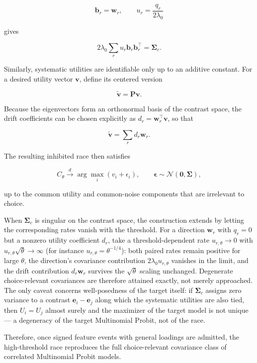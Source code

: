 \documentclass[
  man,
  floatsintext,
  longtable,
  a4paper,
  nolmodern,
  notxfonts,
  notimes,
  colorlinks=true,linkcolor=blue,citecolor=blue,urlcolor=blue]{apa7}
\begin{document}
\[
\mathbf b_r=\mathbf w_r,
\qquad
u_r=\frac{q_r}{2\lambda_0}
\]

gives

\[
2\lambda_0
\sum_r
u_r\mathbf b_r\mathbf b_r^\top
=
\boldsymbol\Sigma_c.
\]

Similarly, systematic utilities are identifiable only up to an additive
constant. For a desired utility vector \(\mathbf v\), define its
centered version

\[
\widetilde{\mathbf v}
=
\mathbf P\mathbf v.
\]

Because the eigenvectors form an orthonormal basis of the contrast
space, the drift coefficients can be chosen explicitly as
\(d_r=\mathbf w_r^\top\mathbf v\), so that

\[
\widetilde{\mathbf v}
=
\sum_r d_r\mathbf w_r.
\]

The resulting inhibited race then satisfies

\[
C_\theta
\xrightarrow{d}
\arg\max_i
\left(
v_i+\epsilon_i
\right),
\qquad
\boldsymbol\epsilon
\sim
\mathcal N(\mathbf 0,\boldsymbol\Sigma),
\]

up to the common utility and common-noise components that are irrelevant
to choice.

When \(\boldsymbol\Sigma_c\) is singular on the contrast space, the
construction extends by letting the corresponding rates vanish with the
threshold. For a direction \(\mathbf w_r\) with \(q_r=0\) but a nonzero
utility coefficient \(d_r\), take a threshold-dependent rate
\(u_{r,\theta}\to 0\) with \(u_{r,\theta}\sqrt{\theta}\to\infty\) (for
instance \(u_{r,\theta}=\theta^{-1/4}\)): both paired rates remain
positive for large \(\theta\), the direction's covariance contribution
\(2\lambda_0 u_{r,\theta}\) vanishes in the limit, and the drift
contribution \(d_r\mathbf w_r\) survives the \(\sqrt{\theta}\) scaling
unchanged. Degenerate choice-relevant covariances are therefore attained
exactly, not merely approached. The only caveat concerns well-posedness
of the target itself: if \(\boldsymbol\Sigma_c\) assigns zero variance
to a contrast \(\mathbf e_i-\mathbf e_j\) along which the systematic
utilities are also tied, then \(U_i=U_j\) almost surely and the
maximizer of the target model is not unique --- a degeneracy of the
target Multinomial Probit, not of the race.

Therefore, once signed feature events with general loadings are
admitted, the high-threshold race reproduces the full choice-relevant
covariance class of correlated Multinomial Probit models.
\end{document}
